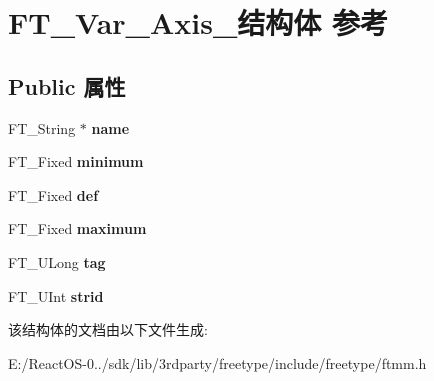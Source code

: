 \hypertarget{struct_f_t___var___axis__}{}\section{F\+T\+\_\+\+Var\+\_\+\+Axis\+\_\+结构体 参考}
\label{struct_f_t___var___axis__}
\subsection*{Public 属性}
\begin{DoxyCompactItemize}
\item 
\mbox{\label{struct_f_t___var___axis___a8d0e0af322a692999ec3733a3e18a5a4}} 
F\+T\+\_\+\+String $\ast$ {\bfseries name}
\item 
\mbox{\label{struct_f_t___var___axis___aae13a8dea1c96bc3949019e8117e7edb}} 
F\+T\+\_\+\+Fixed {\bfseries minimum}
\item 
\mbox{\label{struct_f_t___var___axis___a37a6ca4188a6bfd95d9d06538bf1a3dd}} 
F\+T\+\_\+\+Fixed {\bfseries def}
\item 
\mbox{\label{struct_f_t___var___axis___a5704641439e9f318cf3c2b73864e3260}} 
F\+T\+\_\+\+Fixed {\bfseries maximum}
\item 
\mbox{\label{struct_f_t___var___axis___a01ef9396e34e740c2d2b8c7117094624}} 
F\+T\+\_\+\+U\+Long {\bfseries tag}
\item 
\mbox{\label{struct_f_t___var___axis___a297d28ab0f5666e56d7575249ccc75d7}} 
F\+T\+\_\+\+U\+Int {\bfseries strid}
\end{DoxyCompactItemize}


该结构体的文档由以下文件生成\+:\begin{DoxyCompactItemize}
\item 
E\+:/\+React\+O\+S-\/0../sdk/lib/3rdparty/freetype/include/freetype/ftmm.\+h\end{DoxyCompactItemize}
